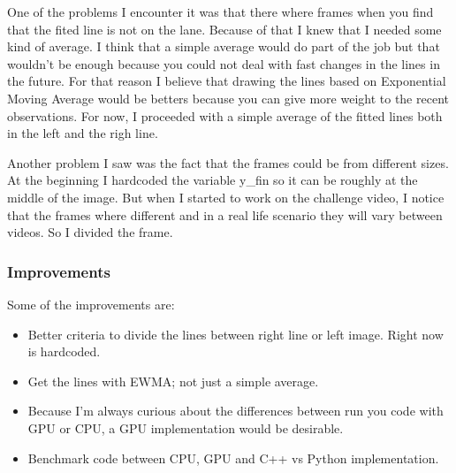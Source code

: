 \documentclass[11pt, a4paper]{article}
\begin{document}
	One of the problems I encounter it was that there where frames when you find that the fited line is not on the lane. Because of that I knew that I needed some kind of average. I think that a simple average would do part of the job but that wouldn't be enough because you could not deal with fast changes in the lines in the future. For that reason I believe that drawing the lines based on Exponential Moving Average would be betters because you can give more weight to the recent observations. For now, I proceeded with a simple average of the fitted lines both in the left and the righ line.


	Another problem I saw was the fact that the frames could be from different sizes. At the beginning I hardcoded the variable y\_fin so it can be roughly at the middle of the image. But when I started to work on the challenge video, I notice that the frames where different and in a real life scenario they will vary between videos. So I divided the frame.


	\subsubsection{Improvements}%
	\label{ssub:improvements}
	
		
	Some of the improvements are:
	\begin{itemize}
		\item Better criteria to divide the lines between right line or left image. Right now is hardcoded.
		\item Get the lines with EWMA; not just a simple average.
		\item Because I'm always curious about the differences between run you code with GPU or CPU, a GPU implementation would be desirable.
		\item Benchmark code between CPU, GPU and C++ vs Python implementation.
	\end{itemize}
	
\end{document}
